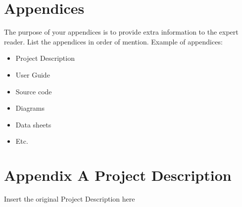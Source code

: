 \documentclass{article}
\begin{document}
	\printbibliography
	\newpage
	\section{Appendices}
	The purpose of your appendices is to provide extra information to the expert reader. List the appendices in order of mention.
	Example of appendices:
	\begin{itemize}
		\item Project Description
		\item User Guide
		\item Source code
		\item Diagrams
		\item Data sheets
		\item Etc.
	\end{itemize}
	\newpage
	\section*{Appendix A Project Description}
	Insert the original Project Description here
\end{document}
